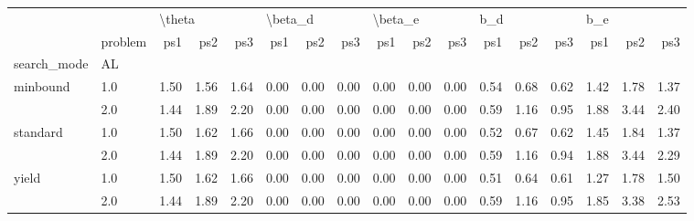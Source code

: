 \begin{tabular}{llrrrrrrrrrrrrrrr}
\toprule
      & {} & \multicolumn{3}{l}{\textbackslash theta} & \multicolumn{3}{l}{\textbackslash beta\_d} & \multicolumn{3}{l}{\textbackslash beta\_e} & \multicolumn{3}{l}{b\_d} & \multicolumn{3}{l}{b\_e} \\
      & problem &    ps1 &  ps2 &  ps3 &     ps1 &  ps2 &  ps3 &     ps1 &  ps2 &  ps3 &  ps1 &  ps2 &  ps3 &  ps1 &  ps2 &  ps3 \\
search\_mode & AL &        &      &      &         &      &      &         &      &      &      &      &      &      &      &      \\
\midrule
minbound & 1.0 &   1.50 & 1.56 & 1.64 &    0.00 & 0.00 & 0.00 &    0.00 & 0.00 & 0.00 & 0.54 & 0.68 & 0.62 & 1.42 & 1.78 & 1.37 \\
      & 2.0 &   1.44 & 1.89 & 2.20 &    0.00 & 0.00 & 0.00 &    0.00 & 0.00 & 0.00 & 0.59 & 1.16 & 0.95 & 1.88 & 3.44 & 2.40 \\
standard & 1.0 &   1.50 & 1.62 & 1.66 &    0.00 & 0.00 & 0.00 &    0.00 & 0.00 & 0.00 & 0.52 & 0.67 & 0.62 & 1.45 & 1.84 & 1.37 \\
      & 2.0 &   1.44 & 1.89 & 2.20 &    0.00 & 0.00 & 0.00 &    0.00 & 0.00 & 0.00 & 0.59 & 1.16 & 0.94 & 1.88 & 3.44 & 2.29 \\
yield & 1.0 &   1.50 & 1.62 & 1.66 &    0.00 & 0.00 & 0.00 &    0.00 & 0.00 & 0.00 & 0.51 & 0.64 & 0.61 & 1.27 & 1.78 & 1.50 \\
      & 2.0 &   1.44 & 1.89 & 2.20 &    0.00 & 0.00 & 0.00 &    0.00 & 0.00 & 0.00 & 0.59 & 1.16 & 0.95 & 1.85 & 3.38 & 2.53 \\
\bottomrule
\end{tabular}
